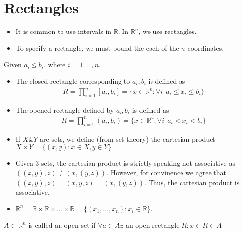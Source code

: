 \documentclass[a4paper]{article}
\numberwithin{equation}{section}
\newcommand{\R}{\mathbb{R}}
\begin{document}
\section{Rectangles}
\begin{itemize}
    \item It is common to use intervals in $\R$. In $\R^n$, we use rectangles. 
    \item To specify a rectangle, we must bound the each of the $n$ coordinates.
\end{itemize}
\begin{definition}
    Given $a_i\leq b_i$, where $i=1,\dots, n$,
    \begin{itemize}
        \item The closed rectangle corresponding to $a_i,b_i$ is defined as
        \begin{align}
            R=\prod_{i=1}^n[a_i,b_i]=\{x\in\R^n:\forall i\:\: a_i\leq x_i\leq b_i\}
        \end{align}
        \item The opened rectangle defined by $a_i,b_i$ is defined as 
        \begin{align}
            R=\prod_{i=1}^n(a_i,b_i)=\{x\in\R^n:\forall i\:\: a_i<x_i<b_i\}
        \end{align}
    \end{itemize}
\end{definition}
\begin{itemize}
    \item If $X\&Y$ are sets, we define (from set theory) the cartesian product $X\times Y=\{(x,y): x\in X,y\in Y\}$
    \item Given 3 sets, the cartesian product is strictly speaking not associative as $((x,y),z)\neq(x,(y,z))$. However, for convinence we agree that $((x,y),z)=(x,y,z)=(x,(y,z))$. Thus, the cartesian product is associative.
    \item $\R^n=\R\times\R\times\dots\times\R=\{(x_1,\dots,x_n):x_i\in\R\}$.
\end{itemize}
\begin{definition}
    $A\subset\R^n$ is called an open set if $\forall a\in A\exists$ an open rectangle $R: x\in R\subset A$
\end{definition}
\end{document}
